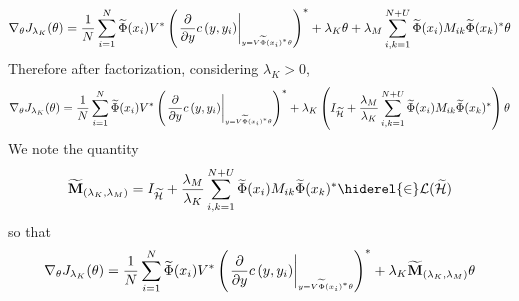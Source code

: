 \begin{dmath*}
\nabla_{\theta} J_{\lambda_K}(\theta) = \frac{1}{N}\sum_{i=1}^N \tildePhi{\omega}(x_i)V^\adjoint \left(\lderivativeat{c\left(y, y_i\right)}{y}{V\tildePhi{\omega}(x_i)^\adjoint \theta}\right)^\adjoint + \lambda_K\theta + \lambda_M\sum_{i,k=1}^{N+U}\tildePhi{\omega}(x_i)M_{ik}\tildePhi{\omega}(x_k)^\adjoint \theta
\end{dmath*}
Therefore after factorization, considering $\lambda_K > 0$,
\begin{dmath*}
\nabla_{\theta} J_{\lambda_K}(\theta) = \frac{1}{N}\sum_{i=1}^N \tildePhi{\omega}(x_i)V^\adjoint \left(\lderivativeat{c\left(y, y_i\right)}{y}{V\tildePhi{\omega}(x_i)^\adjoint \theta}\right)^\adjoint + \lambda_K\left(I_{\tildeH{\omega}} + \frac{\lambda_M}{\lambda_K}\sum_{i,k=1}^{N+U}\tildePhi{\omega}(x_i)M_{ik}\tildePhi{\omega}(x_k)^\adjoint \right)\theta
\end{dmath*}
We note the quantity
\begin{dmath}
\widetilde{\mathbf{M}}_{\left(\lambda_K,\lambda_M\right)}=I_{\tildeH{\omega}} + \frac{\lambda_M}{\lambda_K}\sum_{i,k=1}^{N+U}\tildePhi{\omega}(x_i)M_{ik}\tildePhi{\omega}(x_k)^\adjoint \hiderel{\in} \mathcal{L}(\tildeH{\omega})
\end{dmath}
so that
\begin{dmath*}
\nabla_{\theta} J_{\lambda_K}(\theta) = \frac{1}{N}\sum_{i=1}^N \tildePhi{\omega}(x_i)V^\adjoint \left(\lderivativeat{c\left(y, y_i\right)}{y}{V\tildePhi{\omega}(x_i)^\adjoint \theta}\right)^\adjoint + \lambda_K\widetilde{\mathbf{M}}_{\left(\lambda_K,\lambda_M\right)}\theta
\end{dmath*}
